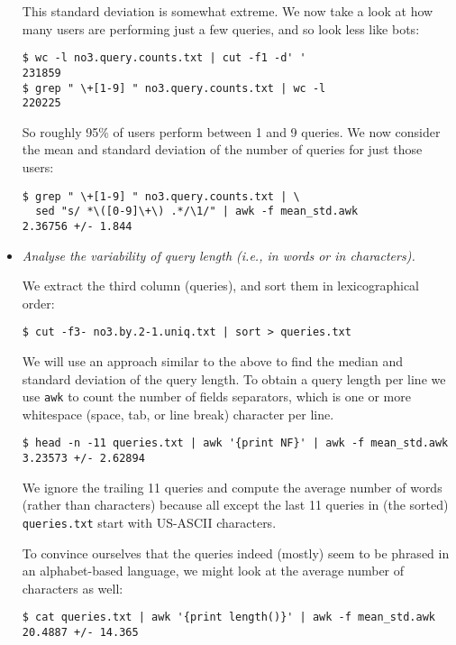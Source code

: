 \begin{itemize}
This standard deviation is somewhat extreme. We now take a look at how many
users are performing just a few queries, and so look less like bots:

\begin{lstlisting}
$ wc -l no3.query.counts.txt | cut -f1 -d' '
231859
$ grep " \+[1-9] " no3.query.counts.txt | wc -l
220225
\end{lstlisting}

So roughly 95\% of users perform between 1 and 9 queries. We now consider
the mean and standard deviation of the number of queries for just those users:

\begin{lstlisting}
$ grep " \+[1-9] " no3.query.counts.txt | \
  sed "s/ *\([0-9]\+\) .*/\1/" | awk -f mean_std.awk
2.36756 +/- 1.844
\end{lstlisting}

\item \emph{Analyse the variability of query length (i.e., in words or in
characters).}

We extract the third column (queries), and sort them in lexicographical order:

\begin{lstlisting}
$ cut -f3- no3.by.2-1.uniq.txt | sort > queries.txt
\end{lstlisting}

We will use an approach similar to the above to find the median and standard
deviation of the query length. To obtain a query length per line we use
\texttt{awk} to count the number of fields separators, which is one or more
whitespace (space, tab, or line break) character per line.

\begin{lstlisting}
$ head -n -11 queries.txt | awk '{print NF}' | awk -f mean_std.awk 
3.23573 +/- 2.62894
\end{lstlisting}

We ignore the trailing 11 queries and compute the average number of words
(rather than characters) because all except the last 11 queries in (the sorted)
\texttt{queries.txt} start with US-ASCII characters.

To convince ourselves that the queries indeed (mostly) seem to be phrased in an
alphabet-based language, we might look at the average number of characters as
well:

\begin{lstlisting}
$ cat queries.txt | awk '{print length()}' | awk -f mean_std.awk 
20.4887 +/- 14.365
\end{lstlisting}


\end{itemize}
